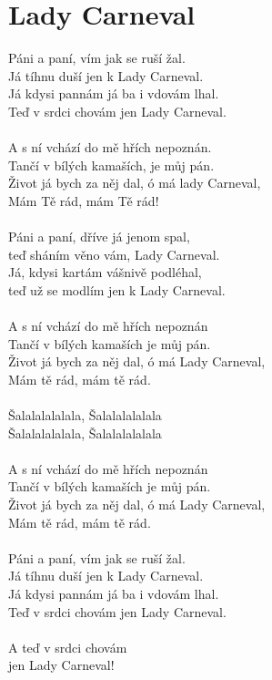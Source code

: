 \section{Lady Carneval}
Páni a paní, vím jak se ruší žal.\\
Já tíhnu duší jen k Lady Carneval.\\
Já kdysi pannám já ba i vdovám lhal.\\
Teď v srdci chovám jen Lady Carneval.\\
\\
A s ní vchází do mě hřích nepoznán.\\
Tančí v bílých kamaších, je můj pán.\\
Život já bych za něj dal, ó má lady Carneval,\\
Mám Tě rád, mám Tě rád!\\
\\
Páni a paní, dříve já jenom spal,\\
teď sháním věno vám, Lady Carneval.\\
Já, kdysi kartám vášnivě podléhal,\\
teď už se modlím jen k Lady Carneval.\\
\\
A s ní vchází do mě hřích nepoznán\\
Tančí v bílých kamaších je můj pán.\\
Život já bych za něj dal, ó má Lady Carneval,\\
Mám tě rád, mám tě rád.\\
\\
Šalalalalalala, Šalalalalalala\\
Šalalalalalala, Šalalalalalala\\
\\
A s ní vchází do mě hřích nepoznán\\
Tančí v bílých kamaších je můj pán.\\
Život já bych za něj dal, ó má Lady Carneval,\\
Mám tě rád, mám tě rád.\\
\\
Páni a paní, vím jak se ruší žal.\\
Já tíhnu duší jen k Lady Carneval.\\
Já kdysi pannám já ba i vdovám lhal.\\
Teď v srdci chovám jen Lady Carneval.\\
\\
A teď v srdci chovám\\
jen Lady Carneval!
